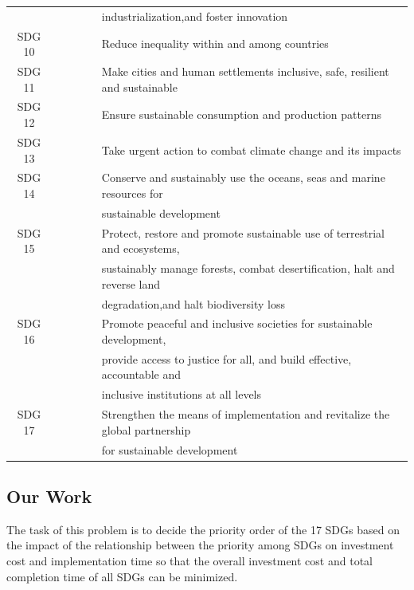 \documentclass[10pt]{mcmthesis}
\begin{document}
\begin{table}[h]
\begin{tabular}{clllll}
       &  &  &  &  & industrialization,and foster innovation                                      \\
SDG 10 &  &  &  &  & Reduce inequality within and among countries                                 \\
SDG 11 &  &  &  &  & Make cities and human settlements inclusive, safe, resilient and sustainable   \\
SDG 12 &  &  &  &  & Ensure sustainable consumption and production patterns                       \\
SDG 13 &  &  &  &  & Take urgent action to combat climate change and its impacts                  \\
SDG 14 &  &  &  &  & Conserve and sustainably use the oceans, seas and marine resources for        \\
       &  &  &  &  & sustainable development                                                      \\
SDG 15 &  &  &  &  & Protect, restore and promote sustainable use of terrestrial and ecosystems,   \\
       &  &  &  &  & sustainably manage forests, combat desertification, halt and reverse land      \\
       &  &  &  &  & degradation,and halt biodiversity loss                                       \\
SDG 16 &  &  &  &  & Promote peaceful and inclusive societies for sustainable development,        \\
       &  &  &  &  & provide access to justice for all, and build effective, accountable and        \\
       &  &  &  &  & inclusive institutions at all levels                                         \\
SDG 17 &  &  &  &  & Strengthen the means of implementation and revitalize the global partnership \\
       &  &  &  &  & for sustainable development                                                  \\ \hline
\end{tabular}
\end{table}
\vspace{-15pt}

\subsection{Our Work}
The task of this problem is to decide the priority order of the 17 SDGs based on the impact of the relationship between the priority among SDGs on investment cost and implementation time so that the overall investment cost and total completion time of all SDGs can be minimized.
\end{document}
